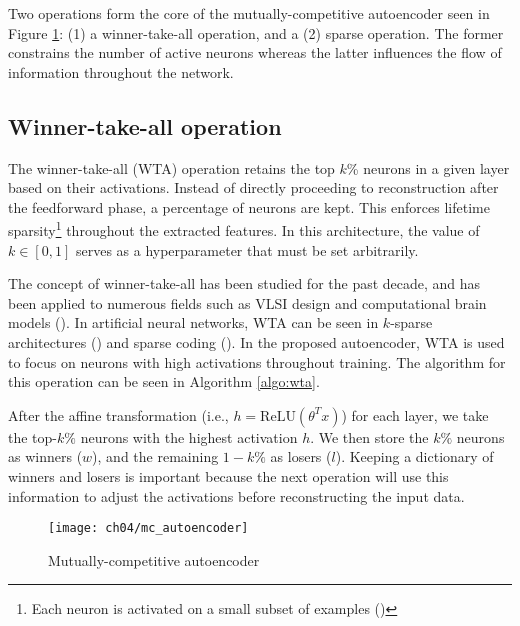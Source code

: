 Two operations form the core of the mutually-competitive autoencoder seen in
Figure \ref{schema:mc_autoencoder}: (1) a winner-take-all operation, and a (2)
sparse operation. The former constrains the number of active neurons whereas the
latter influences the flow of information throughout the network.

\subsection{Winner-take-all operation}

\par The winner-take-all (WTA) operation retains the top $k$\% neurons in a
given layer based on their activations. Instead of directly proceeding to
reconstruction after the feedforward phase, a percentage of neurons are kept.
This enforces lifetime sparsity\footnote{ Each neuron is activated on a small
subset of examples (\cite{willmore2001characterizing}) } throughout the
extracted features. In this architecture, the value of $k \in
\left[0,1\right]$ serves as a hyperparameter that must be set arbitrarily.

\par The concept of winner-take-all has been studied for the past decade, and
has been applied to numerous fields such as VLSI design and computational
brain models (\cite{maass2000computational}). In artificial neural networks,
WTA can be seen in $k$-sparse architectures (\cite{coates2011sparse,
makhzani2014ksparse, makhzani2015winner}) and sparse coding
(\cite{lee2007efficient, olshausen1996emergence}). In the proposed
autoencoder, WTA is used to focus on neurons with high activations throughout
training. The algorithm for this operation can be seen in Algorithm
\ref{algo:wta}.

\par After the affine transformation (i.e., $h = \text{ReLU}(\theta^{T}x)$)
for each layer, we take the top-$k\%$ neurons with the highest activation
$h$. We then store the $k\%$ neurons as winners ($w$), and the remaining
$1-k\%$ as losers ($l$). Keeping a dictionary of winners and losers is
important because the next operation will use this information to adjust the
activations before reconstructing the input data.

\begin{figure}[!t]
  \centering
  \texttt{[image: ch04/mc\_autoencoder]}
  \caption[Mutually-competitive autoencoder architecture]
  {Mutually-competitive autoencoder}
  \label{schema:mc_autoencoder}
\end{figure}

